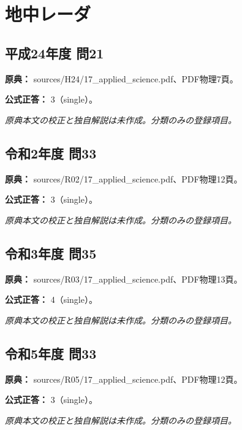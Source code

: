 \section{地中レーダ}

\subsection{平成24年度 問21}
\label{q:h24-reg-applied-21}

\noindent\textbf{原典：} sources/H24/17\_applied\_science.pdf、PDF物理7頁。

\textbf{公式正答：} 3（single）。

\par\textit{原典本文の校正と独自解説は未作成。分類のみの登録項目。}

\subsection{令和2年度 問33}
\label{q:r02-reg-applied-33}

\noindent\textbf{原典：} sources/R02/17\_applied\_science.pdf、PDF物理12頁。

\textbf{公式正答：} 3（single）。

\par\textit{原典本文の校正と独自解説は未作成。分類のみの登録項目。}

\subsection{令和3年度 問35}
\label{q:r03-reg-applied-35}

\noindent\textbf{原典：} sources/R03/17\_applied\_science.pdf、PDF物理13頁。

\textbf{公式正答：} 4（single）。

\par\textit{原典本文の校正と独自解説は未作成。分類のみの登録項目。}

\subsection{令和5年度 問33}
\label{q:r05-reg-applied-33}

\noindent\textbf{原典：} sources/R05/17\_applied\_science.pdf、PDF物理12頁。

\textbf{公式正答：} 3（single）。

\par\textit{原典本文の校正と独自解説は未作成。分類のみの登録項目。}

